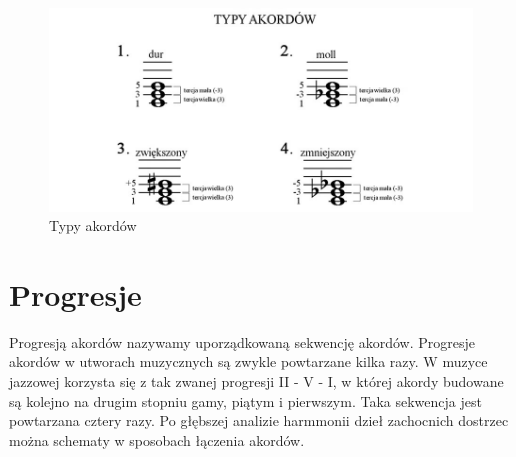 \documentclass[]{book}
\theoremstyle{definition}
\begin{document}
\begin{appendices}
	\begin{figure}[H]
		\centering
		\includegraphics[width=0.7\linewidth]{typy_akordow}
		\caption{Typy akordów}
		\label{fig:typyakordow}
	\end{figure}
	
	
	
	\section{Progresje}
	Progresją akordów nazywamy uporządkowaną sekwencję akordów. Progresje akordów w utworach muzycznych są zwykle powtarzane kilka razy. W muzyce jazzowej korzysta się z tak zwanej progresji II - V - I, w której akordy budowane są kolejno na drugim stopniu gamy, piątym i pierwszym. Taka sekwencja jest powtarzana cztery razy. Po głębszej analizie harmmonii dzieł zachocnich dostrzec można schematy w sposobach łączenia akordów. 
	
	
	
\end{appendices}


\newpage
\end{document}
